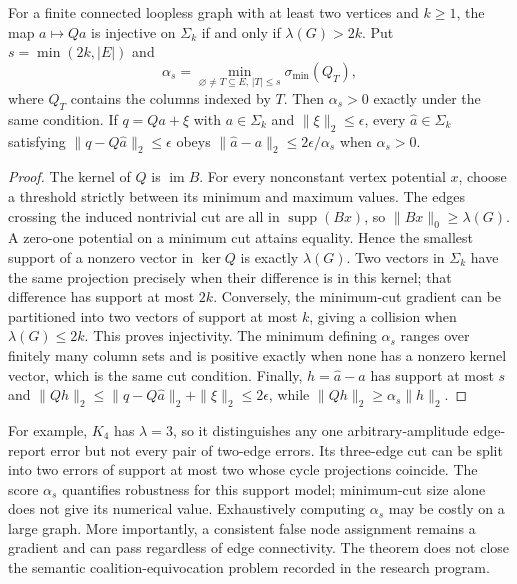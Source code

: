 \documentclass[11pt,a4paper]{article}
\begin{document}
\begin{theorem}\label{thm:sparse-cut-identifiability}
For a finite connected loopless graph with at least two vertices and $k\ge1$, the map $a\mapsto Qa$ is injective on $\Sigma_k$ if and only if $\lambda(G)>2k$. Put $s=\min(2k,|E|)$ and
\[
\alpha_s=\min_{\varnothing\ne T\subseteq E,\,|T|\le s}\sigma_{\min}(Q_T),
\]
where $Q_T$ contains the columns indexed by $T$. Then $\alpha_s>0$ exactly under the same condition. If $q=Qa+\xi$ with $a\in\Sigma_k$ and $\|\xi\|_2\le\epsilon$, every $\widehat a\in\Sigma_k$ satisfying $\|q-Q\widehat a\|_2\le\epsilon$ obeys $\|\widehat a-a\|_2\le2\epsilon/\alpha_s$ when $\alpha_s>0$.
\end{theorem}
\begin{proof}
The kernel of $Q$ is $\operatorname{im}B$. For every nonconstant vertex potential $x$, choose a threshold strictly between its minimum and maximum values. The edges crossing the induced nontrivial cut are all in $\operatorname{supp}(Bx)$, so $\|Bx\|_0\ge\lambda(G)$. A zero-one potential on a minimum cut attains equality. Hence the smallest support of a nonzero vector in $\ker Q$ is exactly $\lambda(G)$. Two vectors in $\Sigma_k$ have the same projection precisely when their difference is in this kernel; that difference has support at most $2k$. Conversely, the minimum-cut gradient can be partitioned into two vectors of support at most $k$, giving a collision when $\lambda(G)\le2k$. This proves injectivity. The minimum defining $\alpha_s$ ranges over finitely many column sets and is positive exactly when none has a nonzero kernel vector, which is the same cut condition. Finally, $h=\widehat a-a$ has support at most $s$ and $\|Qh\|_2\le\|q-Q\widehat a\|_2+\|\xi\|_2\le2\epsilon$, while $\|Qh\|_2\ge\alpha_s\|h\|_2$.
\end{proof}

For example, $K_4$ has $\lambda=3$, so it distinguishes any one arbitrary-amplitude edge-report error but not every pair of two-edge errors. Its three-edge cut can be split into two errors of support at most two whose cycle projections coincide. The score $\alpha_s$ quantifies robustness for this support model; minimum-cut size alone does not give its numerical value. Exhaustively computing $\alpha_s$ may be costly on a large graph. More importantly, a consistent false node assignment remains a gradient and can pass regardless of edge connectivity. The theorem does not close the semantic coalition-equivocation problem recorded in the research program.
\end{document}
